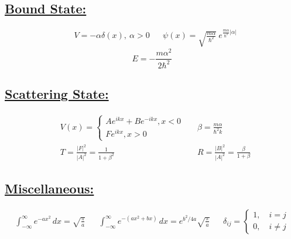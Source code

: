 \documentclass[a4paper,12pt]{article}
\begin{document}
\subsection*{\underline{Bound State:}}
\begin{align*}
    &V=-\alpha\delta(x), \ \alpha>0
    &
    &\psi(x)=\sqrt{\frac{m\alpha}{\hbar^2}}\ e^{\frac{m\alpha}{\hbar^2}|\alpha|}
\end{align*}
\begin{equation*}
    E=-\frac{m\alpha^2}{2\hbar^2}
\end{equation*}
\subsection*{\underline{Scattering State:}}
\begin{align*}
    &V(x)=\left\{
        \begin{matrix}
            Ae^{ikx}+Be^{-ikx}, x<0\\
            Fe^{ikx}, x>0
        \end{matrix}
    \right.
    &
    &\beta = \frac{m\alpha}{\hbar^2k}
    \\
    &T=\frac{|F|^2}{|A|^2}=\frac{1}{1+\beta^2}
    &
    &R=\frac{|B|^2}{|A|^2}=\frac{\beta}{1+\beta}
\end{align*}
\subsection*{\underline{Miscellaneous:}}
\begin{align*}
    \int_{-\infty}^\infty e^{-ax^2}\, dx=\sqrt{\frac{\pi}{a}}
    &&
    \int_{-\infty}^\infty e^{-(ax^2+bx)}\,dx=e^{b^2/4a}\sqrt{\frac{\pi}{a}}
    &&
    \delta_{ij}=\left\{
        \begin{matrix}
            1,\quad i=j\\
            0,\quad i\neq j
        \end{matrix}
    \right.
\end{align*}
\end{document}
